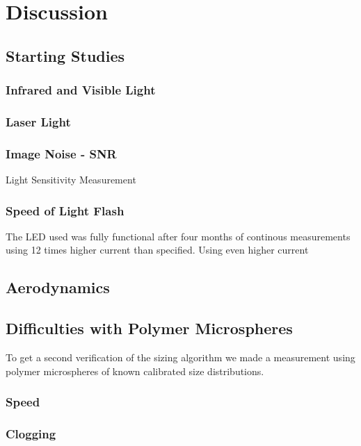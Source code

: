 
\chapter{Discussion}
\label{chap:discussion}

\section{Starting Studies}

\subsection{Infrared and Visible Light}

\subsection{Laser Light}

\subsection{Image Noise - SNR}


Light Sensitivity Measurement
\subsection{Speed of Light Flash}

The LED used was fully functional after four months of continous measurements using 12 times higher current than specified. Using even higher current 

\section{Aerodynamics}

\section{Difficulties with Polymer Microspheres}
To get a second verification of the sizing algorithm we made a measurement using polymer microspheres of known calibrated size distributions.
\subsection{Speed}


\subsection{Clogging}


